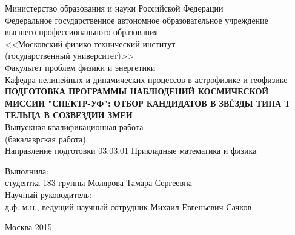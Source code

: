 \begin{titlepage}
\newpage
\begin{center}
Министерство образования и науки Российской Федерации\\
\vspace{1em} 
Федеральное государственное автономное образовательное учреждение\\
высшего профессионального образования\\
<<Московский физико-технический институт\\
(государственный университет)>>\\
\vspace{1em}
Факультет проблем физики и энергетики\\
\vspace{1em}
Кафедра нелинейных и динамических процессов в астрофизике и геофизике\\
\vspace{5em}
\textbf{\large\MakeTextUppercase{Подготовка программы наблюдений космической миссии "Спектр-УФ": отбор кандидатов в звёзды типа Т Тельца в созвездии Змеи}}\\
\vspace{1em}
Выпускная квалификационная работа\\
(бакалаврская работа)\\
\vspace{1em}
Направление подготовки 03.03.01 Прикладные математика и физика\\
\end{center}
\begin{flushleft}
\vspace{3em}
Выполнила:\\
студентка 183 группы \hrulefill Молярова Тамара Сергеевна\\
\vspace{3em}
Научный руководитель:\\
д.ф.-м.н., ведущий научный сотрудник \hrulefill Михаил Евгеньевич Сачков\\
\vspace{\fill}
\end{flushleft}
\begin{center}
Москва 2015
\end{center}
\end{titlepage}